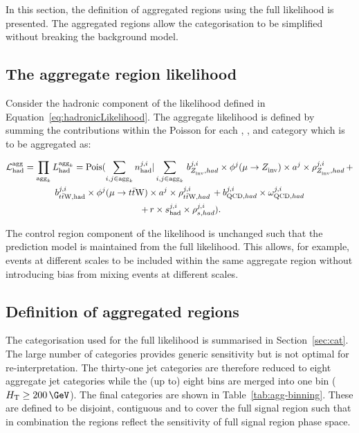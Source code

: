In this section, the definition of aggregated regions 
using the full likelihood is presented. The aggregated regions allow the categorisation to be 
simplified without breaking the background model. 

\subsection{The aggregate region likelihood}

Consider the hadronic component of the likelihood defined in Equation~\ref{eq:hadronicLikelihood}.
The aggregate likelihood is defined by summing the contributions within the Poisson for
each \mht, \scalht, \nb and \njet category which is to be aggregated as:

\begin{multline}
\label{eq:aggregatedLikelihood}
\mathcal{L}^{\text{agg}}_{\mathrm{had}} = \prod_{\text{agg}_{k}} {L}^{\text{agg}_{k}}_{\mathrm{had}} = \mathrm{Pois}(\sum_{i,j\in\text{agg}_{k}} n^{j,i}_{\mathrm{had}} |\sum_{i,j\in\text{agg}_{k}}\, b^{j,i}_{Z_{\rm inv}^{~},had}\times\phi^{j}(\mu\rightarrow Z_{\rm inv}^{~})\times a^{j}\times\rho^{j,i}_{Z_{\rm inv}^{~},had}\, + \\ 
b^{j,i}_{t\bar{t}\text{W},\mathrm{had}}\times\phi^{j}(\mu\rightarrow t\bar{t}\text{W})\times a^{j}\times\rho^{j,i}_{t\bar{t}\text{W},had}\, + b^{j,i}_{\text{QCD},had}\times\omega^{j,i}_{\text{QCD},had}\\\
+ \,r\times s^{j,i}_{\mathrm{had}}\times\rho^{j,i}_{s,had}).
\end{multline}

The control region component of the likelihood is unchanged such that the prediction model
is maintained from the full likelihood. This allows, for example, events 
at different scales to be included within the same aggregate region without introducing
bias from mixing events at different scales.

\subsection{Definition of aggregated regions}
\label{sec:ssr-alphat}
The categorisation used for the full likelihood is summarised in Section~\ref{sec:cat}. 
The large number of categories provides generic sensitivity but is not optimal for re-interpretation. 
The thirty-one jet categories are therefore reduced to eight aggregate jet categories while
the (up to) eight \scalht bins are merged into one bin ($\scalht \geq 200\,\GeV$).
The final categories are shown in Table~\ref{tab:agg-binning}.
These are defined to be disjoint, contiguous and to cover the full
signal region such that in combination the regions reflect the sensitivity of
full signal region phase space.


